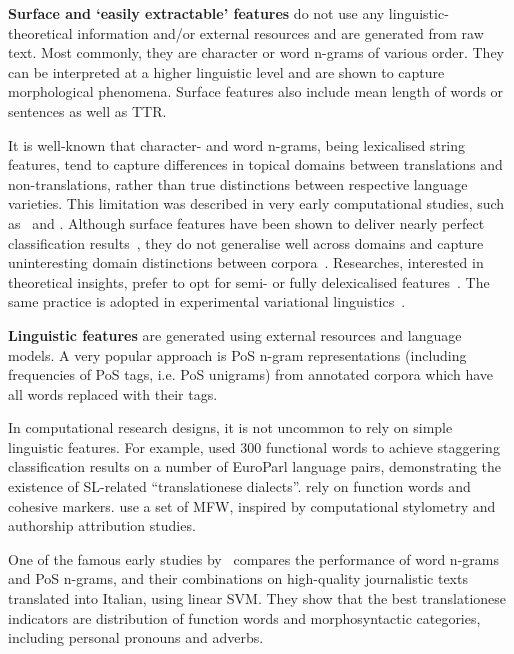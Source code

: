 \textbf{Surface and `easily extractable' features} do not use any linguistic-theoretical information and/or external resources and are generated from raw text. Most commonly, they are character or word n-grams of various order. They can be interpreted at a higher linguistic level and are shown to capture morphological phenomena.
Surface features also include mean length of words or sentences as well as \gls{TTR}. 

It is well-known that character- and word n-grams, being lexicalised string features, tend to capture differences in topical domains between translations and non-translations, rather than true distinctions between respective language varieties. This limitation was described in very early computational studies, such as~\citet{Baroni2005} and \citet{VanHalteren2008}. Although surface features have been shown to deliver nearly perfect classification results~\cite{Popescu2011}, they do not generalise well across domains and capture uninteresting domain distinctions between corpora~\cite{Eetemadi2015}. Researches, interested in theoretical insights, prefer to opt for semi- or fully delexicalised features~\cite{Lapshinova2018,Nikolaev2020,Hu2021}. The same practice is adopted in experimental variational linguistics~\cite{Diwersy2014}.

\textbf{Linguistic features} are generated using external resources and language models. A very popular approach is \gls{PoS} n-gram representations (including frequencies of PoS tags, i.e. PoS unigrams) from annotated corpora which have all words replaced with their tags. 

In computational research designs, it is not uncommon to rely on simple linguistic features. For example, \citet{Koppel2011} used 300 functional words to achieve staggering classification results on a number of EuroParl language pairs, demonstrating the existence of SL-related ``translationese dialects''. \citet{Rabinovich2015} rely on function words and cohesive markers. \citet{Nisioi2013} use a set of \gls{MFW}, inspired by computational stylometry and authorship attribution studies.

One of the famous early studies by~\citet{Baroni2006} compares the performance of word n-grams and PoS n-grams, and their combinations on high-quality journalistic texts translated into Italian, using linear \gls{SVM}. They show that the best translationese indicators are distribution of function words and morphosyntactic categories, including personal pronouns and adverbs.

